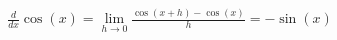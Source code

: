 \documentclass[preview]{standalone}
\begin{document}
\begin{align*}
\frac{d}{dx} \cos(x) = \lim_{h \to 0} \frac{\cos(x+h) - \cos(x)}{h} = -\sin(x)
\end{align*}
\end{document}
